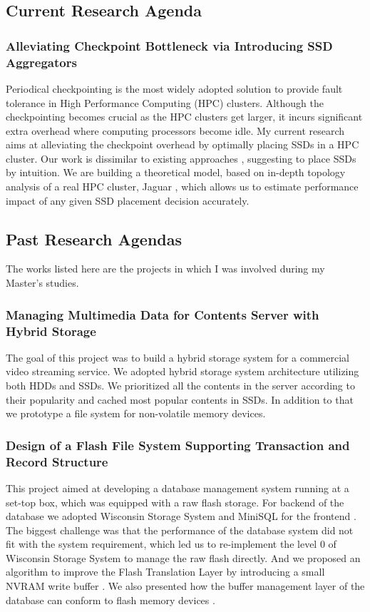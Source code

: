\documentclass[letterpaper, 10pt]{article}
\begin{document}
\subsection*{Current Research Agenda}

\subsubsection*{Alleviating Checkpoint Bottleneck via Introducing SSD
Aggregators}

Periodical checkpointing is the most widely adopted solution to provide
fault tolerance in High Performance Computing (HPC) clusters. Although the
checkpointing becomes crucial as the HPC clusters get larger, it
incurs significant extra overhead where computing processors become idle.
My current research aims at alleviating the checkpoint overhead by optimally
placing SSDs in a HPC cluster. Our work is dissimilar to existing approaches
\cite{bg}\cite{burst},
suggesting to place SSDs by intuition.
We are building a theoretical model,
based on in-depth topology analysis of a real HPC cluster, Jaguar \cite{jaguar},
which allows us to estimate performance impact of any given SSD placement decision
accurately.

\subsection*{Past Research Agendas}

The works listed here are the projects in which I was involved during my
Master's studies.

\subsubsection*{Managing Multimedia Data for Contents Server with Hybrid
Storage}
The goal of this project was to build a hybrid storage system for a commercial
video streaming service. We adopted hybrid storage system architecture utilizing
both HDDs and SSDs. We prioritized all the contents in the server
according to their popularity and cached most popular contents in SSDs.
In addition to that we prototype a file system for non-volatile memory devices.

\subsubsection*{Design of a Flash File System Supporting
Transaction and Record Structure}
This project aimed at developing a database management system running at a
set-top box, which was equipped with a raw flash storage. For backend of the
database we adopted Wisconsin Storage System \cite{wiss} and MiniSQL for the
frontend \cite{minisql}. The biggest challenge was that the performance of the
database system did not fit with the system requirement, which led us to
re-implement the level 0 of Wisconsin Storage System to manage the raw flash
directly. And we proposed an algorithm to improve the Flash Translation Layer
by introducing a small NVRAM write buffer 
\cite{tc}.
We also presented how the buffer
management layer of the database can conform to flash memory devices
\cite{tce}.
\end{document}
